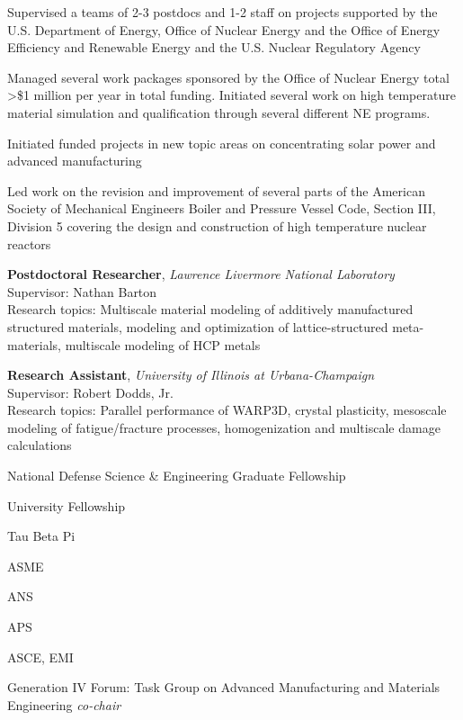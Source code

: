 Supervised a teams of 2-3 postdocs and 1-2 staff on projects
supported by the U.S. Department of Energy, Office of Nuclear Energy and 
the Office of Energy Efficiency and Renewable Energy
and the U.S. Nuclear Regulatory Agency

Managed several work packages sponsored by the Office of Nuclear Energy total >\$1 million per year in total funding.  
Initiated several work on high temperature material simulation and qualification through several different NE programs.

Initiated funded projects in new topic areas on concentrating solar power and advanced manufacturing

Led work on the revision and improvement of several parts of the American Society of 
Mechanical Engineers Boiler and Pressure Vessel Code, Section III, Division 5 covering the
design and construction of high temperature nuclear reactors

\textbf{Postdoctoral Researcher}, \emph{Lawrence Livermore National
Laboratory} \\
Supervisor: Nathan Barton \\
Research topics: Multiscale material modeling of additively manufactured
structured materials, modeling and optimization of lattice-structured
meta-materials, multiscale modeling of HCP metals

\textbf{Research Assistant}, \emph{University of Illinois at Urbana-Champaign}
\\
Supervisor: Robert Dodds, Jr. \\
Research topics: Parallel performance of WARP3D, crystal plasticity,
mesoscale modeling of fatigue/fracture processes, homogenization and
multiscale damage calculations


National Defense Science \& Engineering Graduate Fellowship 

University Fellowship 

Tau Beta Pi 


ASME 

ANS 

APS 

ASCE, EMI 


Generation IV Forum:  Task Group on Advanced Manufacturing and Materials Engineering \emph{co-chair} 


